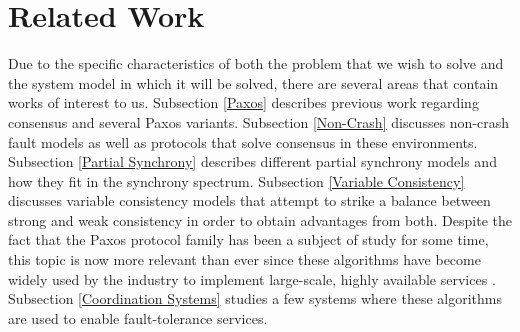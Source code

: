 \chapter{Related Work} \label{Related Work}

Due to the specific characteristics of both the problem that we wish to solve and the system model in which it will be solved, there are several areas that contain works of interest to us. Subsection \ref{Paxos} describes previous work regarding consensus and several Paxos variants. Subsection \ref{Non-Crash} discusses non-crash fault models as well as protocols that solve consensus in these environments. Subsection \ref{Partial Synchrony} describes different partial synchrony models and how they fit in the synchrony spectrum. Subsection \ref{Variable Consistency} discusses variable consistency models that attempt to strike a balance between strong and weak consistency in order to obtain advantages from both. Despite the fact that the Paxos protocol family has been a subject of study for some time, this topic is now more relevant than ever since these algorithms have become widely used by the industry to implement large-scale, highly available services \cite{Burrows2006,Hunt2010}. Subsection \ref{Coordination Systems} studies a few systems where these algorithms are used to enable fault-tolerance services.

